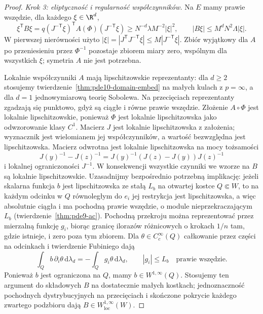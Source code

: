 \begin{proof}
\emph{Krok 3: eliptyczność i regularność współczynników.}
Na $E$ mamy prawie wszędzie, dla każdego $\xi\in\R^d$,
\[
 \xi^{\mathsf T}B\xi
 =q(J^{-\mathsf T}\xi)^{\mathsf T}A(\Phi)(J^{-\mathsf T}\xi)
 \ge N^{-d}\lambda M^{-2}|\xi|^2,
 \qquad |B\xi|\le M^d N^2\Lambda|\xi|.
\]
W pierwszej nierówności użyto
$|\xi|=|J^{\mathsf T}J^{-\mathsf T}\xi|
\le M|J^{-\mathsf T}\xi|$. Zbiór wyjątkowy dla $A$
po przeniesieniu przez $\Phi^{-1}$ pozostaje zbiorem miary
zero, wspólnym dla wszystkich $\xi$; symetria $A$
nie jest potrzebna.

Lokalnie współczynniki $A$ mają lipschitzowskie
reprezentanty: dla $d\ge2$ stosujemy
twierdzenie~\ref{thm:pde10-domain-embed} na małych kulach
z $p=\infty$, a dla $d=1$ jednowymiarową teorię Sobolewa.
Na przecięciach reprezentanty zgadzają się punktowo,
gdyż są ciągłe i równe prawie wszędzie.
Złożenie $A\circ\Phi$ jest lokalnie lipschitzowskie,
ponieważ $\Phi$ jest lokalnie lipschitzowska jako
odwzorowanie klasy $C^1$. Macierz $J$ jest lokalnie
lipschitzowska z założenia; wyznacznik jest wielomianem
jej współczynników, a wartość bezwzględna jest
lipschitzowska. Macierz odwrotna jest lokalnie
lipschitzowska na mocy tożsamości
\[
 J(y)^{-1}-J(z)^{-1}
 =J(y)^{-1}(J(z)-J(y))J(z)^{-1}
\]
i lokalnej ograniczoności $J^{-1}$.
W konsekwencji wszystkie czynniki we wzorze na $B$
są lokalnie lipschitzowskie. Uzasadnijmy bezpośrednio
potrzebną implikację: jeżeli skalarna funkcja $b$ jest
lipschitzowska ze stałą $L_b$ na otwartej kostce
$Q\Subset W$, to na każdym odcinku w $Q$ równoległym
do $e_i$ jej restrykcja jest lipschitzowska, a więc
absolutnie ciągła i ma pochodną prawie wszędzie,
o module nieprzekraczającym $L_b$
(twierdzenie~\ref{thm:pde9-ac}). Pochodną przekroju
można reprezentować przez mierzalną funkcję $g_i$,
biorąc granicę ilorazów różnicowych o krokach $1/n$
tam, gdzie istnieje, i zero poza tym zbiorem.
Dla $\theta\in C_c^\infty(Q)$ całkowanie przez części
na odcinkach i twierdzenie Fubiniego dają
\[
 \int_Q b\,\partial_i\theta\,\mathrm d\lambda_d
 =-\int_Q g_i\theta\,\mathrm d\lambda_d,
 \qquad |g_i|\le L_b\quad\text{prawie wszędzie}.
\]
Ponieważ $b$ jest ograniczona na $Q$, mamy
$b\in W^{1,\infty}(Q)$. Stosujemy ten argument do
składowych $B$ na dostatecznie małych kostkach;
jednoznaczność pochodnych dystrybucyjnych na przecięciach
i skończone pokrycie każdego zwartego podzbioru
dają $B\in W^{1,\infty}_{\mathrm{loc}}(W)$.


\end{proof}
